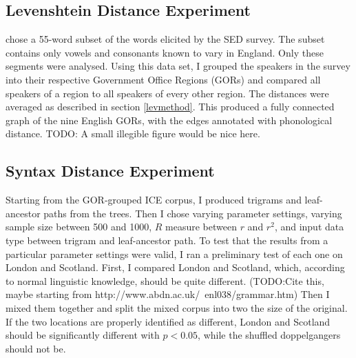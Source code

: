 \documentclass[11pt]{article}
\begin{document}

\subsection{Levenshtein Distance Experiment}

 chose a 55-word subset of the words elicited
by the SED survey. The subset contains only vowels and consonants known
to vary in England. Only these segments were analysed. Using this data
set, I grouped the speakers in the survey into their respective
Government Office Regions (GORs) and compared all speakers of a region to all
speakers of every other region. The distances were averaged as
described in section \ref{levmethod}. This produced a fully connected
graph of the nine English GORs, with the edges annotated with
phonological distance. TODO: A small illegible figure would be nice
here.

\subsection{Syntax Distance Experiment}

Starting from the GOR-grouped ICE corpus, I produced trigrams and
leaf-ancestor paths from the trees. Then I chose varying parameter
settings, varying sample size between 500 and 1000, $R$ measure
between $r$ and $r^2$, and input data type between trigram and
leaf-ancestor path. To test that the results from a particular
parameter settings were valid, I ran a preliminary test of each one on London and
Scotland. First, I compared London and Scotland, which, according to
normal linguistic knowledge, should be quite different.
(TODO:Cite this, maybe starting from http://www.abdn.ac.uk/~enl038/grammar.htm)
Then I mixed them
together and split the mixed corpus into two the size of the
original. If the two locations are properly identified as different,
London and Scotland should be significantly different with $p < 0.05$, while the
shuffled doppelgangers should not be.
\end{document}
